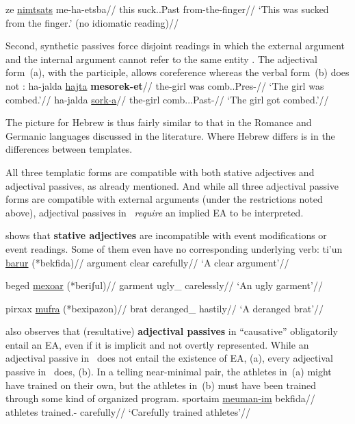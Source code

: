     \a
        \begingl
        \gla {}ze \underline{nimtsats} me-ha-etsba//
        \glb this suck..Past from-the-finger//
        \glft `This was sucked from the finger.' (no idiomatic reading)//
        \endgl
\xe

Second, synthetic passives force disjoint readings in which the external argument and the internal argument cannot refer to the same entity \citep{bakeretal89}. The adjectival form~(\nextx a), with the participle, allows coreference whereas the verbal form~(\nextx b) does not \citep[720]{sichel09}:
\pex \label{ex:disjoint}
    \a \begingl
        \gla {}ha-jalda \underline{hajta} \textbf{mesorek-et}//
        \glb the-girl was comb..Pres-//
        \glft `The girl was combed.'//
        \endgl
    \a
        \begingl
        \gla {}ha-jalda \underline{sork-a}//
        \glb the-girl comb...Past-//
        \glft `The girl got combed.'//
        \endgl
\xe

The picture for Hebrew is thus fairly similar to that in the Romance and Germanic languages discussed in the literature. Where Hebrew differs is in the differences between templates.

All three templatic forms are compatible with both stative adjectives and adjectival passives, as already mentioned. And while all three adjectival passive forms are compatible with external arguments (under the restrictions noted above), adjectival passives in \mhuf~\emph{require} an implied EA to be interpreted.

\citet[170]{doron14adj} shows that \textbf{stative adjectives} are incompatible with event modifications or event readings. Some of them even have no corresponding underlying verb:
\pex
	\a \begingl
		\gla ti'un \underline{barur} (*bekfida)//
		\glb argument clear \phantom{(*}carefully//
		\glft `A clear argument'//
	\endgl

	\a \begingl
		\gla beged \underline{mexoar} (*beriʃul)//
		\glb garment ugly_{} \phantom{(*}carelessly//
		\glft `An ugly garment'//
	\endgl

	\a \begingl
		\gla pirxax \underline{mufra} (*bexipazon)//
		\glb brat deranged_{} \phantom{(*}hastily//
		\glft `A deranged brat'//
	\endgl
\xe

\citet[175]{doron14adj} also observes that (resultative) \textbf{adjectival passives} in ``causative'' {\mhuf} obligatorily entail an EA, even if it is implicit and not overtly represented. While an adjectival passive in \mpua~does not entail the existence of EA, (\nextx a), every adjectival passive in \mhuf~does, (\nextx b). In a telling near-minimal pair, the athletes in~(\nextx a) might have trained on their own, but the athletes in~(\nextx b) must have been trained through some kind of organized program.
\pex\label{ex:sportaim}
	\a \begingl
		\gla\rightcomment{(\mpua)}sportaim \underline{meuman-im} bekfida//
		\glb athletes trained.- carefully//
		\glft `Carefully trained athletes'//
	\endgl
	

